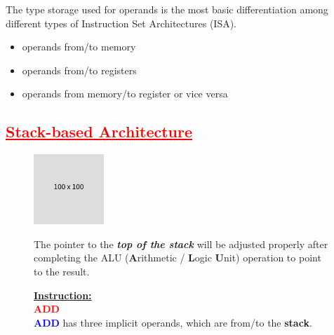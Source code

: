 \documentclass[
  16pt,
  a4paper,
]{report}
\providecommand{\tightlist}{%
  \setlength{\itemsep}{0pt}\setlength{\parskip}{0pt}}\usepackage{longtable,booktabs,array}
\begin{document}
\begin{tcolorbox}[colback=boxbodycol, colframe=boxbodycol]

The type storage used for operands is the most basic differentiation
among different types of Instruction Set Architectures (ISA).

\begin{itemize}
\tightlist
\item
  operands from/to memory
\item
  operands from/to registers
\item
  operands from memory/to register or vice versa
\end{itemize}

\end{tcolorbox}

\subsection{\texorpdfstring{\textcolor{red}{\underline{Stack-based Architecture}}}{}}\label{section}

\begin{figure}[H]

\begin{minipage}{0.40\linewidth}

\includegraphics{index_files/mediabag/FiKGhYhhIWJYiBgWIoaF.png}\end{minipage}%
%
\begin{minipage}{0.60\linewidth}

\begin{tcolorbox}[colback=boxbodycol, colframe=boxbodycol]
The pointer to the \textbf{\emph{top of the stack}} will be adjusted
properly after completing the ALU (\textbf{A}rithmetic / \textbf{L}ogic
\textbf{U}nit) operation to point to the result.

\end{tcolorbox}

\begin{tcolorbox}[colback=boxbodycol, colframe=boxbodycol]
\textbf{\underline{Instruction:}}\\
\textcolor{red}{\textbf{ADD}}\\
\textcolor{blue}{\textbf{ADD}} has three implicit operands, which are
from/to the \textbf{stack}.

\end{tcolorbox}

\end{minipage}%

\end{figure}%
\end{document}
